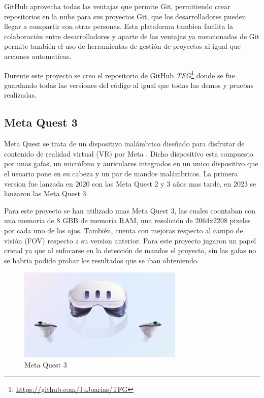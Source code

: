 \documentclass[a4paper, 12pt]{book}
\begin{document}
GitHub aprovecha todas las ventajas que permite Git, permitiendo crear repositorios en la nube para sus proyectos Git, que los desarrolladores pueden llegar a compartir con otras personas. Esta plataforma tambien facilita la colaboración entre desarrolladores y aparte de las ventajas ya mencionadas de Git permite también el uso de herramientas de gestión de proyectos al igual que acciones automaticas. 

Durente este proyecto se creo el repositorio de GitHub \textit{TFG}\footnote{\url{https://github.com/JuJoarias/TFG}} donde se fue guardando todas las versiones del código al igual que todas las demos y pruebas realizadas.
\subsection{Meta Quest 3}
\label{subsec:metaquest}

Meta Quest se trata de un dispositivo inalámbrico diseñado para disfrutar de contenido de realidad virtual (VR) por Meta \cite{meta_company_info}. Dicho dispositivo esta compuesto por unas gafas, un micrófono y auriculares integrados en un unico dispositivo que el usuario pone en su cabeza y un par de mandos inalámbricos. 
La primera version fue lanzada en 2020 con las Meta Quest 2 y 3 años mas tarde, en 2023 se lanzaron las Meta Quest 3. 

Para este proyecto se han utilizado unas Meta Quest 3, las cuales coontaban con una memoria de 8 GBB de memoria RAM, una resolición de 2064x2208 pixeles por cada uno de los ojos. También, cuenta con mejoras respecto al campo de visión (FOV) respecto a su version anterior. Para este proyecto jugaron un papel cricial ya que al enfocarse en la detección de mandos
el proyecto, sin las gafas no se habria podido probar los resultados que se iban obteniendo.

\begin{figure}[H] 
  \centering
  \includegraphics[width=0.7\textwidth]{img/meta_quest.jpg}
  \caption{Meta Quest 3}
  \label{fig:metaquest}
\end{figure}
\end{document}
